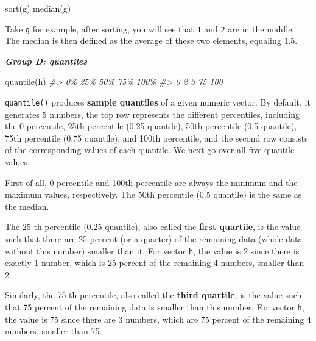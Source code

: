 \documentclass[
]{book}
\newenvironment{Shaded}{\begin{snugshade}}{\end{snugshade}}
\newcommand{\CommentTok}[1]{\textcolor[rgb]{0.56,0.35,0.01}{\textit{#1}}}
\newcommand{\FunctionTok}[1]{\textcolor[rgb]{0.00,0.00,0.00}{#1}}
\newcommand{\NormalTok}[1]{#1}
\newenvironment{blackbox}{
  \definecolor{shadecolor}{rgb}{0, 0, 0}  %
  \color{white}
  \begin{shaded}}
 {\end{shaded}}
\newenvironment{infobox}[1]
  {
  \begin{itemize}
  \renewcommand{\labelitemi}{
    \raisebox{-.7\height}[0pt][0pt]{
      {\setkeys{Gin}{width=3em,keepaspectratio}
        \texttt{[image: pics/\#1]}}
    }
  }
  \setlength{\fboxsep}{1em}
  \begin{blackbox}
  \item
  }
  {
  \end{blackbox}
  \end{itemize}
  }
\begin{document}
\begin{infobox}{caution}

\begin{Shaded}
\begin{Highlighting}[]
\FunctionTok{sort}\NormalTok{(g)}
\FunctionTok{median}\NormalTok{(g)}
\end{Highlighting}
\end{Shaded}

Take \texttt{g} for example, after sorting, you will see that \texttt{1} and \texttt{2} are in the middle. The median is then defined as the average of these two elements, equaling 1.5.

\end{infobox}

\textbf{\emph{Group D: quantiles}}

\begin{Shaded}
\begin{Highlighting}[]
\FunctionTok{quantile}\NormalTok{(h)}
\CommentTok{\#\textgreater{}   0\%  25\%  50\%  75\% 100\% }
\CommentTok{\#\textgreater{}    0    2    3   75  100}
\end{Highlighting}
\end{Shaded}

\texttt{quantile()} produces \textbf{sample quantiles} of a given numeric vector. By default, it generates 5 numbers, the top row represents the different percentiles, including the 0 percentile, 25th percentile (0.25 quantile), 50th percentile (0.5 quantile), 75th percentile (0.75 quantile), and 100th percentile, and the second row consists of the corresponding values of each quantile. We next go over all five quantile values.

First of all, 0 percentile and 100th percentile are always the minimum and the maximum values, respectively. The 50th percentile (0.5 quantile) is the same as the median.

The 25-th percentile (0.25 quantile), also called the \textbf{first quartile}, is the value such that there are 25 percent (or a quarter) of the remaining data (whole data without this number) smaller than it. For vector \texttt{h}, the value is 2 since there is exactly 1 number, which is 25 percent of the remaining 4 numbers, smaller than 2.

Similarly, the 75-th percentile, also called the \textbf{third quartile}, is the value such that 75 percent of the remaining data is smaller than this number. For vector \texttt{h}, the value is 75 since there are 3 numbers, which are 75 percent of the remaining 4 numbers, smaller than 75.
\end{document}
